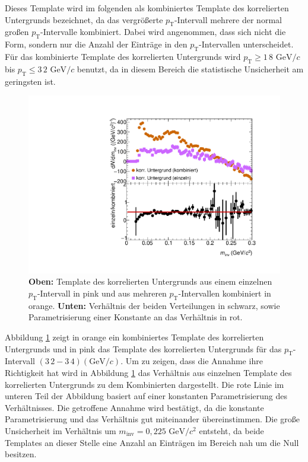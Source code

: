 Dieses Template wird im folgenden als kombiniertes Template des korrelierten Untergrunds bezeichnet, da das vergrößerte $p_\text{T}$-Intervall mehrere der normal großen $p_\text{T}$-Intervalle kombiniert.
Dabei wird angenommen, dass sich nicht die Form, sondern nur die Anzahl der Einträge in den $p_\text{T}$-Intervallen unterscheidet.  
Für das kombinierte Template des korrelierten Untergrunds wird $p_\text{T} \geq 1\,8\text{ GeV}/c$ bis $p_\text{T} \leq 3\,2\text{ GeV}/c$ benutzt, da in diesem Bereich die statistische Unsicherheit am geringsten ist.
\begin{figure}[t!]
\centering
\includegraphics[width=.7\linewidth]{BackgroundWithRatio10_Data_2016.pdf}
\caption{\textbf{Oben:} Template des korrelierten Untergrunds aus einem einzelnen $p_\text{T}$-Intervall in pink und aus mehreren $p_\text{T}$-Intervallen kombiniert in orange.
\textbf{Unten:} Verhältnis der beiden Verteilungen in schwarz, sowie Parametrisierung einer Konstante an das Verhältnis in rot.}
\label{fig:BkgTempRatio}
\end{figure}
\newline
Abbildung \ref{fig:BkgTempRatio} zeigt in orange ein kombiniertes Template des korrelierten Untergrunds und in pink das Template des korrelierten Untergrunds für das $p_\text{T}$-Intervall $(3\,2 - 3\,4) (\text{GeV/}c)$.
Um zu zeigen, dass die Annahme ihre Richtigkeit hat wird in Abbildung \ref{fig:BkgTempRatio} das Verhältnis aus einzelnen Template des korrelierten Untergrunds zu dem Kombinierten dargestellt.
Die rote Linie im unteren Teil der Abbildung basiert auf einer konstanten Parametrisierung des Verhältnisses.
Die getroffene Annahme wird bestätigt, da die konstante Parametrisierung und das Verhältnis gut miteinander übereinstimmen.
Die große Unsicherheit im Verhältnis um $m_\text{inv} = 0,225\text{ GeV}/c^{2}$ entsteht, da beide Templates an dieser Stelle eine Anzahl an Einträgen im Bereich nah um die Null besitzen.
